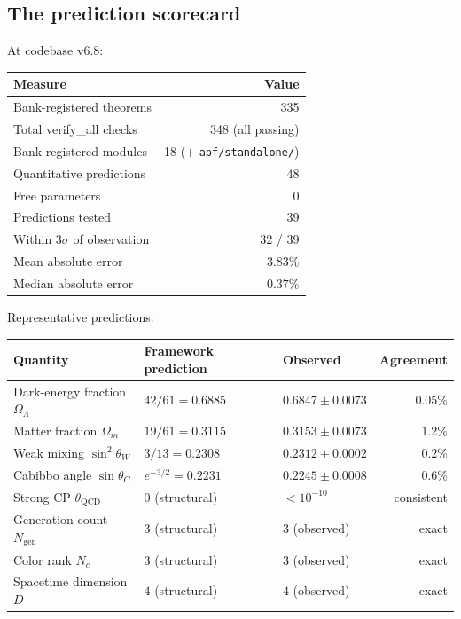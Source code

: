 \documentclass[11pt]{article}
\begin{document}
\subsection{The prediction scorecard}\label{sec:scorecard}

At codebase v6.8:

\begin{center}
\begin{tabular}{lr}
\toprule
\textbf{Measure} & \textbf{Value}\\
\midrule
Bank-registered theorems & 335\\
Total verify\_all checks & 348 (all passing)\\
Bank-registered modules & 18 (+ \texttt{apf/standalone/})\\
Quantitative predictions & 48\\
Free parameters & 0\\
Predictions tested & 39\\
Within $3\sigma$ of observation & 32 / 39\\
Mean absolute error & $3.83\%$\\
Median absolute error & $0.37\%$\\
\bottomrule
\end{tabular}
\end{center}

\noindent Representative predictions:

\begin{center}
\begin{tabular}{lllr}
\toprule
\textbf{Quantity} & \textbf{Framework prediction} & \textbf{Observed} & \textbf{Agreement}\\
\midrule
Dark-energy fraction $\Omega_\Lambda$ & $42/61 = 0.6885$ & $0.6847 \pm 0.0073$ & $0.05\%$\\
Matter fraction $\Omega_m$ & $19/61 = 0.3115$ & $0.3153 \pm 0.0073$ & $1.2\%$\\
Weak mixing $\sin^2\theta_W$ & $3/13 = 0.2308$ & $0.2312 \pm 0.0002$ & $0.2\%$\\
Cabibbo angle $\sin\theta_C$ & $e^{-3/2} = 0.2231$ & $0.2245 \pm 0.0008$ & $0.6\%$\\
Strong CP $\theta_{\mathrm{QCD}}$ & $0$ (structural) & $< 10^{-10}$ & consistent\\
Generation count $N_{\mathrm{gen}}$ & $3$ (structural) & $3$ (observed) & exact\\
Color rank $N_c$ & $3$ (structural) & $3$ (observed) & exact\\
Spacetime dimension $D$ & $4$ (structural) & $4$ (observed) & exact\\
\bottomrule
\end{tabular}
\end{center}
\end{document}
